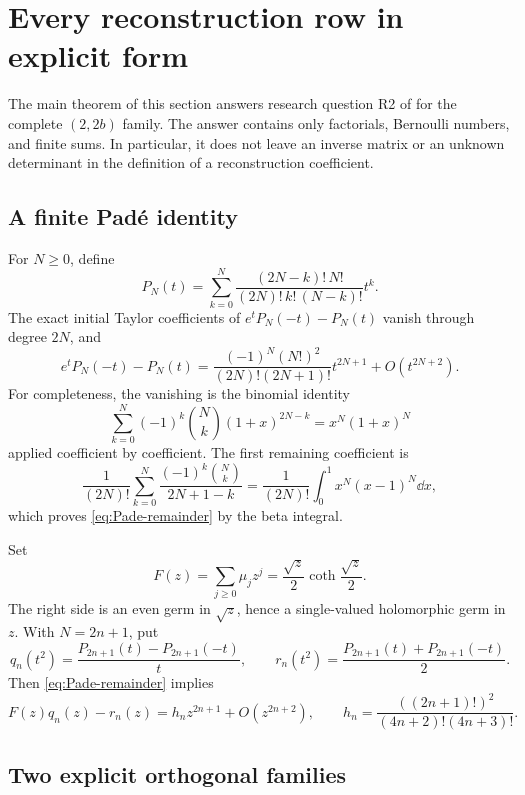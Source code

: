 \section{Every reconstruction row in explicit form}
\label{sec:inverse}

The main theorem of this section answers research question R2 of
\cite{incoming-bernoulli} for the complete $(2,2b)$ family. The answer
contains only factorials, Bernoulli numbers, and finite sums. In
particular, it does not leave an inverse matrix or an unknown
determinant in the definition of a reconstruction coefficient.

\subsection{A finite Pad\'e identity}

For $N\geq0$, define
\begin{equation}\label{eq:PN}
 P_N(t)=\sum_{k=0}^N
  \frac{(2N-k)!\,N!}{(2N)!\,k!\,(N-k)!}t^k.
\end{equation}
The exact initial Taylor coefficients of
$e^tP_N(-t)-P_N(t)$ vanish through degree $2N$, and
\begin{equation}\label{eq:Pade-remainder}
 e^tP_N(-t)-P_N(t)
 =\frac{(-1)^N(N!)^2}{(2N)!(2N+1)!}t^{2N+1}
   +O(t^{2N+2}).
\end{equation}
For completeness, the vanishing is the binomial identity
\[
 \sum_{k=0}^N(-1)^k\binom Nk(1+x)^{2N-k}
 =x^N(1+x)^N
\]
applied coefficient by coefficient. The first remaining coefficient is
\[
 \frac1{(2N)!}\sum_{k=0}^N
  \frac{(-1)^k\binom Nk}{2N+1-k}
 =\frac1{(2N)!}\int_0^1x^N(x-1)^N\dd x,
\]
which proves \eqref{eq:Pade-remainder} by the beta integral.

Set
\begin{equation}\label{eq:Fmu}
 F(z)=\sum_{j\geq0}\mu_jz^j
 =\frac{\sqrt z}{2}\coth\frac{\sqrt z}{2}.
\end{equation}
The right side is an even germ in $\sqrt z$, hence a single-valued
holomorphic germ in $z$. With $N=2n+1$, put
\[
 q_n(t^2)=\frac{P_{2n+1}(t)-P_{2n+1}(-t)}t,
 \qquad
 r_n(t^2)=\frac{P_{2n+1}(t)+P_{2n+1}(-t)}2.
\]
Then \eqref{eq:Pade-remainder} implies
\begin{equation}\label{eq:Fq-r}
 F(z)q_n(z)-r_n(z)=h_nz^{2n+1}+O(z^{2n+2}),
 \qquad
 h_n=\frac{((2n+1)!)^2}{(4n+2)!(4n+3)!}.
\end{equation}

\subsection{Two explicit orthogonal families}

